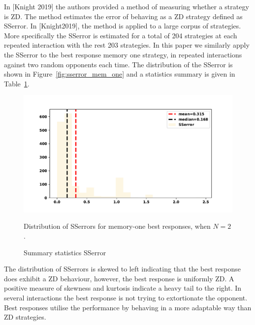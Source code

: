 \documentclass[10pt]{article}
\begin{document}
In [Knight 2019] the authors provided a method of measuring whether a strategy
is ZD. The method estimates the error of behaving as a ZD strategy defined as
SSerror. In [Knight2019], the method is applied to a large corpus of strategies.
More specifically the SSerror is estimated for a total of 204 strategies at each
repeated interaction with the rest 203 strategies. In this paper we similarly
apply the SSerror to the best response memory one strategy, in repeated
interactions against two random opponents each time. The distribution of the
SSerror is shown in Figure~\ref{fig:sserror_mem_one} and a statistics summary is
given in Table~\ref{table:sserror_stats}.

\begin{figure}[!htbp]
    \begin{minipage}{0.70\textwidth}
            \begin{center}
                \includegraphics[width=\linewidth]{img/best_respones_sserror.pdf}
            \end{center}
                \caption{Distribution of SSerrors for memory-one best responses, when \(N=2\).}
                \label{fig:sserror_mem_one}
    \end{minipage}
    \begin{minipage}{0.20\textwidth}
        \centering
        \captionsetup{type=table}
        \resizebox{.85\columnwidth}{!}{%
            }
            \caption{Summary statistics SSerror}
            \label{table:sserror_stats}
      \end{minipage}
\end{figure}

The distribution of SSerrors is skewed to left indicating that the best response
does exhibit a ZD behaviour, however, the best response is uniformly ZD. A
positive measure of skewness and kurtosis indicate a heavy tail to the right. In
several interactions the best response is not trying to extortionate the
opponent. Best responses utilise the performance by behaving in a more adaptable
way than ZD strategies.
\end{document}
